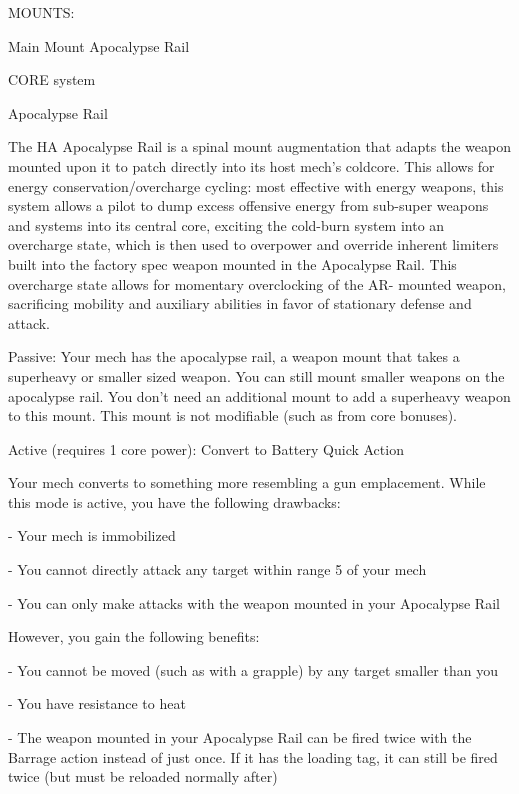                                                 MOUNTS:

 Main Mount                                          Apocalypse Rail

                                              CORE system




                                                Apocalypse Rail

 The HA Apocalypse Rail is a spinal mount augmentation that adapts the weapon mounted upon it to
 patch directly into its host mech’s coldcore. This allows for energy conservation/overcharge cycling:
 most effective with energy weapons, this system allows a pilot to dump excess offensive energy from
 sub-super weapons and systems into its central core, exciting the cold-burn system into an overcharge
 state, which is then used to overpower and override inherent limiters built into the factory spec weapon
 mounted in the Apocalypse Rail. This overcharge state allows for momentary overclocking of the AR-
 mounted weapon, sacrificing mobility and auxiliary abilities in favor of stationary defense and attack.

 Passive: Your mech has the apocalypse rail, a weapon mount that takes a superheavy or smaller sized
 weapon. You can still mount smaller weapons on the apocalypse rail. You don’t need an additional
 mount to add a superheavy weapon to this mount. This mount is not modifiable (such as from core
 bonuses).


 Active (requires 1 core power): Convert to Battery
 Quick Action

 Your mech converts to something more resembling a gun emplacement. While this mode is active, you
 have the following drawbacks:

      -   Your mech is immobilized

      -   You cannot directly attack any target within range 5 of your mech

      -   You can only make attacks with the weapon mounted in your Apocalypse Rail

 However, you gain the following benefits:

      -   You cannot be moved (such as with a grapple) by any target smaller than you

      -   You have resistance to heat

      -   The weapon mounted in your Apocalypse Rail can be fired twice with the Barrage action
          instead of just once. If it has the loading tag, it can still be fired twice (but must be reloaded
          normally after)

